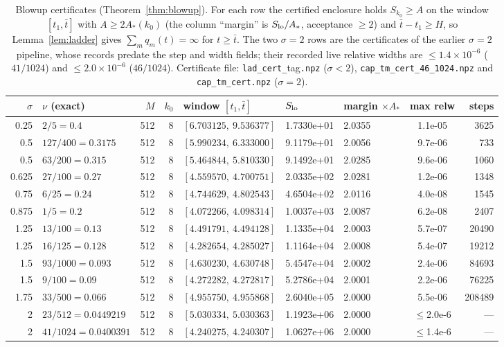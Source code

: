 \begin{table}[htbp]
\centering
\scriptsize
\setlength{\tabcolsep}{3.5pt}
\caption{Blowup certificates (Theorem~\ref{thm:blowup}). For each row the certified enclosure holds $S_{k_0}\ge A$ on the window $[t_1,\bar t]$ with $A\ge2A_*(k_0)$ (the column ``margin'' is $S_{\rm lo}/A_*$, acceptance $\ge2$) and $\bar t-t_1\ge H$, so Lemma~\ref{lem:ladder} gives $\sum_mq_m(t)=\infty$ for $t\ge\bar t$. The two $\sigma=2$ rows are the certificates of the earlier $\sigma=2$ pipeline, whose records predate the step and width fields; their recorded live relative widths are $\le1.4\times10^{-6}$ ($41/1024$) and $\le2.0\times10^{-6}$ ($46/1024$). Certificate file: \texttt{lad\_cert\_}tag\texttt{.npz} ($\sigma<2$), \texttt{cap\_tm\_cert\_46\_1024.npz} and \texttt{cap\_tm\_cert.npz} ($\sigma=2$).}\label{tab:blowup}
\begin{tabular}{@{}rlrrlllcr@{}}
\toprule
$\sigma$ & $\nu$ (exact) & $M$ & $k_0$ & window $[t_1,\bar t]$ & $S_{\rm lo}$ & margin $\times A_*$ & max relw & steps\\
\midrule
0.25 & $2/5=0.4$ & 512 & 8 & $[6.703125,\ 9.536377]$ & 1.7330e+01 & 2.0355 & 1.1e-05 & 3625\\
0.5 & $127/400=0.3175$ & 512 & 8 & $[5.990234,\ 6.333000]$ & 9.1179e+01 & 2.0056 & 9.7e-06 & 733\\
0.5 & $63/200=0.315$ & 512 & 8 & $[5.464844,\ 5.810330]$ & 9.1492e+01 & 2.0285 & 9.6e-06 & 1060\\
0.625 & $27/100=0.27$ & 512 & 8 & $[4.559570,\ 4.700751]$ & 2.0335e+02 & 2.0281 & 1.2e-06 & 1348\\
0.75 & $6/25=0.24$ & 512 & 8 & $[4.744629,\ 4.802543]$ & 4.6504e+02 & 2.0116 & 4.0e-08 & 1545\\
0.875 & $1/5=0.2$ & 512 & 8 & $[4.072266,\ 4.098314]$ & 1.0037e+03 & 2.0087 & 6.2e-08 & 2407\\
1.25 & $13/100=0.13$ & 512 & 8 & $[4.491791,\ 4.494128]$ & 1.1335e+04 & 2.0003 & 5.7e-07 & 20490\\
1.25 & $16/125=0.128$ & 512 & 8 & $[4.282654,\ 4.285027]$ & 1.1164e+04 & 2.0008 & 5.4e-07 & 19212\\
1.5 & $93/1000=0.093$ & 512 & 8 & $[4.630230,\ 4.630748]$ & 5.4547e+04 & 2.0002 & 2.4e-06 & 84693\\
1.5 & $9/100=0.09$ & 512 & 8 & $[4.272282,\ 4.272817]$ & 5.2786e+04 & 2.0001 & 2.2e-06 & 76225\\
1.75 & $33/500=0.066$ & 512 & 8 & $[4.955750,\ 4.955868]$ & 2.6040e+05 & 2.0000 & 5.5e-06 & 208489\\
2 & $23/512=0.0449219$ & 512 & 8 & $[5.030334,\ 5.030363]$ & 1.1923e+06 & 2.0000 & $\le$2.0e-6 & ---\\
2 & $41/1024=0.0400391$ & 512 & 8 & $[4.240275,\ 4.240307]$ & 1.0627e+06 & 2.0000 & $\le$1.4e-6 & ---\\
\bottomrule
\end{tabular}
\end{table}
